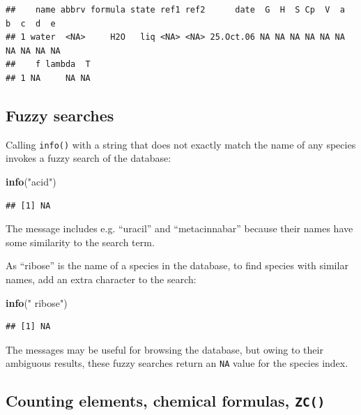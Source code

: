 \documentclass[]{tufte-handout}
\newenvironment{Shaded}{}{}
\newcommand{\KeywordTok}[1]{\textcolor[rgb]{0.00,0.44,0.13}{\textbf{#1}}}
\newcommand{\StringTok}[1]{\textcolor[rgb]{0.25,0.44,0.63}{#1}}
\newcommand{\NormalTok}[1]{#1}
\begin{document}
\begin{verbatim}
##    name abbrv formula state ref1 ref2      date  G  H  S Cp  V  a  b  c  d  e
## 1 water  <NA>     H2O   liq <NA> <NA> 25.Oct.06 NA NA NA NA NA NA NA NA NA NA
##    f lambda  T
## 1 NA     NA NA
\end{verbatim}

\subsection{Fuzzy searches}\label{fuzzy-searches}

Calling {\texttt{info()}} with a string that does not exactly match the
name of any species invokes a fuzzy search of the database:

\begin{Shaded}
\begin{Highlighting}[]
\KeywordTok{info}\NormalTok{(}\StringTok{"acid"}\NormalTok{)}
\end{Highlighting}
\end{Shaded}

\begin{verbatim}
## [1] NA
\end{verbatim}

The message includes e.g. ``uracil'' and ``metacinnabar'' because their
names have some similarity to the search term.

As ``ribose'' is the name of a species in the database, to find species
with similar names, add an extra character to the search:

\begin{Shaded}
\begin{Highlighting}[]
\KeywordTok{info}\NormalTok{(}\StringTok{" ribose"}\NormalTok{)}
\end{Highlighting}
\end{Shaded}

\begin{verbatim}
## [1] NA
\end{verbatim}

The messages may be useful for browsing the database, but owing to their
ambiguous results, these fuzzy searches return an \texttt{NA} value for
the species index.

\subsection{\texorpdfstring{Counting elements, chemical formulas,
{\texttt{ZC()}}}{Counting elements, chemical formulas, ZC()}}\label{counting-elements-chemical-formulas-zc}
\end{document}
